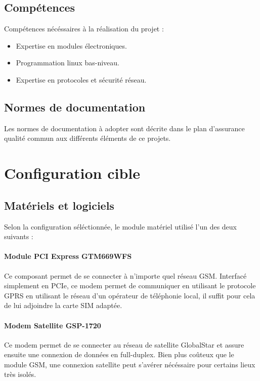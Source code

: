 \subsection{Compétences}

Compétences nécéssaires à la réalisation du projet :

\begin{itemize}
\item Expertise en modules électroniques.
\item Programmation linux bas-niveau.
\item Expertise en protocoles et sécurité réseau.
\end{itemize}

\subsection{Normes de documentation}

Les normes de documentation à adopter sont décrite dans le plan d'assurance qualité commun aux différents éléments de ce projets.

\section{Configuration cible}

\subsection{Matériels et logiciels}

Selon la configuration séléctionnée, le module matériel utilisé l'un des deux suivants :

\paragraph{Module PCI Express GTM669WFS}

Ce composant permet de se connecter à n'importe quel réseau GSM. Interfacé simplement en PCIe, ce modem permet de communiquer en utilisant le protocole GPRS en utilisant le réseau d'un opérateur de téléphonie local, il suffit pour cela de lui adjoindre la carte SIM adaptée.

\paragraph{Modem Satellite GSP-1720}

Ce modem permet de se connecter au réseau de satellite GlobalStar et assure ensuite une connexion de données en full-duplex. Bien plus coûteux que le module GSM, une connexion satellite peut s'avérer nécéssaire pour certains lieux très isolés.

